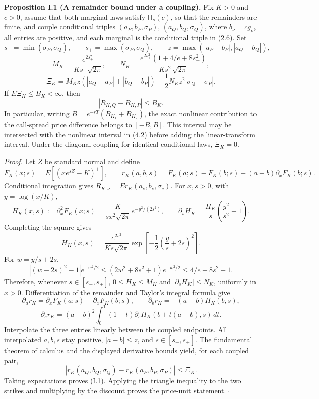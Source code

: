 \documentclass[11pt,a4paper]{article}
\begin{document}
\textbf{Proposition I.1 (A remainder bound under a coupling).}
Fix \(K>0\) and \(c>0\), assume that both marginal laws satisfy \(\mathsf H_s(c)\),
so that the remainders are finite, and couple conditional triples
\((a_P,b_P,\sigma_P)\), \((a_Q,b_Q,\sigma_Q)\), where
\(b_\nu=cg_\nu\), all entries are positive, and each marginal is the
conditional triple in (2.6). Set
\[
s_- =\min(\sigma_P,\sigma_Q),\qquad
s_+ =\max(\sigma_P,\sigma_Q),\qquad
z=\max(|a_P-b_P|,|a_Q-b_Q|),
\]
\[
M_K=\frac{e^{2s_+^2}}{K s_-\sqrt{2\pi}},\qquad
N_K=\frac{e^{2s_+^2}(1+4/e+8s_+^2)}{K s_-^2\sqrt{2\pi}},
\]
\[
\Xi_K=M_Kz\left(|a_Q-a_P|+|b_Q-b_P|\right)
       +\frac12N_Kz^2|\sigma_Q-\sigma_P|.
\]
If \(E\Xi_K\le B_K<\infty\), then
\[
|R_{K,Q}-R_{K,P}|\le B_K.                       \tag{I.1}
\]
In particular, writing \(B=e^{-rT}(B_{K_1}+B_{K_2})\), the exact nonlinear
contribution to the call-spread price difference belongs to
\([-B,B]\). This interval may be intersected with the nonlinear interval
in (4.2) before adding the linear-transform interval. Under the diagonal
coupling for identical conditional laws, \(\Xi_K=0\).

\textit{Proof.}
Let \(Z\) be standard normal and define
\[
F_K(x;s)=E[(xe^{sZ}-K)^+],\qquad
r_K(a,b,s)=F_K(a;s)-F_K(b;s)-(a-b)\partial_xF_K(b;s).
\]
Conditional integration gives \(R_{K,\nu}=E r_K(a_\nu,b_\nu,\sigma_\nu)\).
For \(x,s>0\), with \(y=\log(x/K)\),
\[
H_K(x,s):=\partial_x^2F_K(x;s)
=\frac{K}{s x^2\sqrt{2\pi}}e^{-y^2/(2s^2)},\qquad
\partial_sH_K=\frac{H_K}{s}\left(\frac{y^2}{s^2}-1\right).
\]
Completing the square gives
\[
H_K(x,s)=\frac{e^{2s^2}}{K s\sqrt{2\pi}}
\exp\left[-\frac12\left(\frac ys+2s\right)^2\right].
\]
For \(w=y/s+2s\),
\[
\left|(w-2s)^2-1\right|e^{-w^2/2}
\le(2w^2+8s^2+1)e^{-w^2/2}
\le 4/e+8s^2+1.
\]
Therefore, whenever \(s\in[s_-,s_+]\),
\(0\le H_K\le M_K\) and \(|\partial_sH_K|\le N_K\), uniformly in
\(x>0\). Differentiation of the remainder and Taylor's integral formula give
\[
\partial_a r_K=\partial_xF_K(a;s)-\partial_xF_K(b;s),\qquad
\partial_b r_K=-(a-b)H_K(b,s),
\]
\[
\partial_s r_K=(a-b)^2\int_0^1(1-t)
       \partial_sH_K(b+t(a-b),s)\,dt.
\]
Interpolate the three entries linearly between the coupled endpoints.
All interpolated \(a,b,s\) stay positive,
\(|a-b|\le z\), and \(s\in[s_-,s_+]\). The fundamental theorem of
calculus and the displayed derivative bounds yield, for each coupled pair,
\[
|r_K(a_Q,b_Q,\sigma_Q)-r_K(a_P,b_P,\sigma_P)|\le\Xi_K.
\]
Taking expectations proves (I.1). Applying the triangle inequality to the
two strikes and multiplying by the discount proves the price-unit statement.
\hfill\(\square\)
\end{document}
